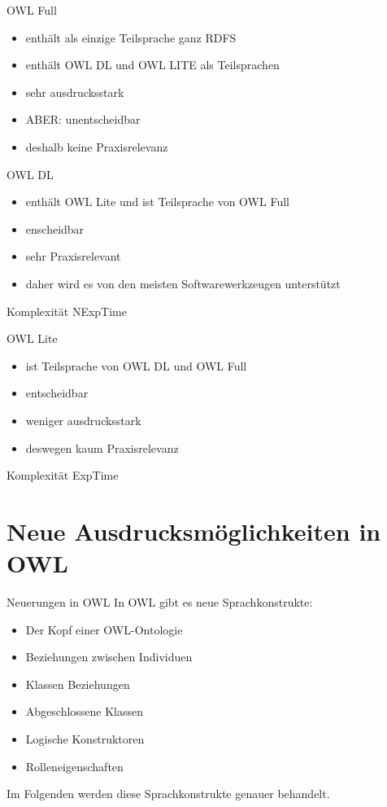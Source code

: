 \documentclass{beamer}
\begin{document}
%
\begin{frame}{OWL Full}
\begin{itemize}
	\item enthält als einzige Teilsprache \alert{ganz} RDFS
	\item enthält OWL DL und OWL LITE als Teilsprachen
	\item sehr ausdrucksstark
	\item ABER: \alert{unentscheidbar}
	\item deshalb keine Praxisrelevanz
\end{itemize}
\end{frame}

%
\begin{frame}{OWL DL}
\begin{itemize}
	\item enthält OWL Lite und ist Teilsprache von OWL Full
	\item enscheidbar
	\item sehr Praxisrelevant
	\item daher wird es von den meisten Softwarewerkzeugen unterstützt
\end{itemize}
\begin{block}{Komplexität}
	NExpTime
\end{block}
\end{frame}

%
\begin{frame}{OWL Lite}
\begin{itemize}
	\item ist Teilsprache von OWL DL und OWL Full
	\item entscheidbar
	\item weniger ausdrucksstark
	\item deswegen kaum Praxisrelevanz
\end{itemize}
\begin{block}{Komplexität}
	ExpTime
\end{block}
\end{frame}


\section{Neue Ausdrucksmöglichkeiten in OWL}
\begin{frame}{Neuerungen in OWL}
In OWL gibt es neue Sprachkonstrukte:
\begin{itemize}
	\item Der Kopf einer OWL-Ontologie
	\item Beziehungen zwischen Individuen
	\item Klassen Beziehungen
	\item Abgeschlossene Klassen
	\item Logische Konstruktoren
	\item Rolleneigenschaften
\end{itemize}
Im Folgenden werden diese Sprachkonstrukte genauer behandelt.
\end{frame}
\end{document}
